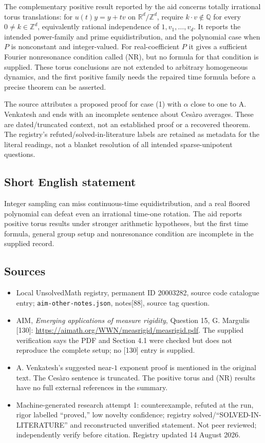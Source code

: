 \documentclass[11pt]{article}
\newcommand{\Z}{\mathbb{Z}}
\newcommand{\Q}{\mathbb{Q}}
\newcommand{\R}{\mathbb{R}}
\begin{document}
The complementary positive result reported by the aid concerns totally irrational torus translations: for $u(t)y=y+t v$ on $\R^d/\Z^d$, require $k\cdot v\notin\Q$ for every $0\ne k\in\Z^d$, equivalently rational independence of $1,v_1,\ldots,v_d$. It reports the intended power-family and prime equidistribution, and the polynomial case when $P$ is nonconstant and integer-valued. For real-coefficient $P$ it gives a sufficient Fourier nonresonance condition called (NR), but no formula for that condition is supplied. These torus conclusions are not extended to arbitrary homogeneous dynamics, and the first positive family needs the repaired time formula before a precise theorem can be asserted.

The source attributes a proposed proof for case (1) with $\alpha$ close to one to A. Venkatesh and ends with an incomplete sentence about Ces\`aro averages. These are dated/truncated context, not an established proof or a recovered theorem. The registry's refuted/solved-in-literature labels are retained as metadata for the literal readings, not a blanket resolution of all intended sparse-unipotent questions.
\subsection{Short English statement}
Integer sampling can miss continuous-time equidistribution, and a real floored polynomial can defeat even an irrational time-one rotation. The aid reports positive torus results under stronger arithmetic hypotheses, but the first time formula, general group setup and nonresonance condition are incomplete in the supplied record.
\subsection{Sources}
\begin{itemize}
\item Local UnsolvedMath registry, permanent ID 20003282, source code catalogue entry; \texttt{aim-other-notes.json}, notes[88], source tag question.
\item AIM, \emph{Emerging applications of measure rigidity}, Question 15, G. Margulis [130]: \url{https://aimath.org/WWN/measrigid/measrigid.pdf}. The supplied verification says the PDF and Section 4.1 were checked but does not reproduce the complete setup; no [130] entry is supplied.
\item A. Venkatesh's suggested near-$1$ exponent proof is mentioned in the original text. The Ces\`aro sentence is truncated. The positive torus and (NR) results have no full external references in the summary.
\item Machine-generated research attempt 1: counterexample, refuted at the run, rigor labelled ``proved,'' low novelty confidence; registry solved/``SOLVED-IN-LITERATURE'' and reconstructed unverified statement. Not peer reviewed; independently verify before citation. Registry updated 14 August 2026.
\end{itemize}
\end{document}
